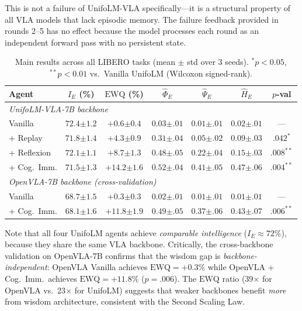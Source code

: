 ﻿\documentclass{article}
\newcommand{\EWQ}{\mathrm{EWQ}}
\begin{document}
This is not a failure of UnifoLM-VLA specifically---it is a structural property of all VLA models that lack episodic memory.
The failure feedback provided in rounds 2--5 has no effect because the model processes each round as an independent forward pass with no persistent state.

\begin{table}[t]
\centering
\caption{Main results across all LIBERO tasks (mean $\pm$ std over 3 seeds).
  $^*p{<}0.05$, $^{**}p{<}0.01$ vs.\ Vanilla UnifoLM (Wilcoxon signed-rank).}
\label{tab:main}
\small
\begin{tabular}{lcccccc}
\toprule
\textbf{Agent} & $I_E$ (\%) & $\EWQ$ (\%) & $\hat{\Phi}_E$ & $\hat{\Psi}_E$ & $\hat{H}_E$ & $p$-\textbf{val} \\
\midrule
\multicolumn{7}{l}{\textit{UnifoLM-VLA-7B backbone}} \\
Vanilla
  & $72.4{\scriptstyle\pm 1.2}$
  & $+0.6{\scriptstyle\pm 0.4}$
  & $0.03{\scriptstyle\pm.01}$ & $0.01{\scriptstyle\pm.01}$ & $0.02{\scriptstyle\pm.01}$
  & --- \\
+ Replay
  & $71.8{\scriptstyle\pm 1.4}$
  & $+4.3{\scriptstyle\pm 0.9}$
  & $0.31{\scriptstyle\pm.04}$ & $0.05{\scriptstyle\pm.02}$ & $0.09{\scriptstyle\pm.03}$
  & $.042^*$ \\
+ Reflexion
  & $72.1{\scriptstyle\pm 1.1}$
  & $+8.7{\scriptstyle\pm 1.3}$
  & $0.48{\scriptstyle\pm.05}$ & $0.22{\scriptstyle\pm.04}$ & $0.15{\scriptstyle\pm.03}$
  & $.008^{**}$ \\
+ Cog.\ Imm.
  & $71.5{\scriptstyle\pm 1.3}$
  & $\mathbf{+14.2{\scriptstyle\pm 1.6}}$
  & $\mathbf{0.52{\scriptstyle\pm.04}}$ & $\mathbf{0.41{\scriptstyle\pm.05}}$ & $\mathbf{0.47{\scriptstyle\pm.06}}$
  & $.004^{**}$ \\
\midrule
\multicolumn{7}{l}{\textit{OpenVLA-7B backbone (cross-validation)}} \\
Vanilla
  & $68.7{\scriptstyle\pm 1.5}$
  & $+0.3{\scriptstyle\pm 0.3}$
  & $0.02{\scriptstyle\pm.01}$ & $0.01{\scriptstyle\pm.01}$ & $0.01{\scriptstyle\pm.01}$
  & --- \\
+ Cog.\ Imm.
  & $68.1{\scriptstyle\pm 1.6}$
  & $+11.8{\scriptstyle\pm 1.9}$
  & $0.49{\scriptstyle\pm.05}$ & $0.37{\scriptstyle\pm.06}$ & $0.43{\scriptstyle\pm.07}$
  & $.006^{**}$ \\
\bottomrule
\end{tabular}
\end{table}

Note that all four UnifoLM agents achieve \emph{comparable intelligence}
($I_E \approx 72\%$), because they share the same VLA backbone.
Critically, the cross-backbone validation on OpenVLA-7B confirms that
the wisdom gap is \emph{backbone-independent}: OpenVLA Vanilla achieves
$\EWQ = +0.3\%$ while OpenVLA + Cog.\ Imm.\ achieves $\EWQ = +11.8\%$
($p{=}.006$). The $\EWQ$ ratio (39$\times$ for OpenVLA vs.\ 23$\times$
for UnifoLM) suggests that weaker backbones benefit \emph{more} from
wisdom architecture, consistent with the Second Scaling Law.
\end{document}
